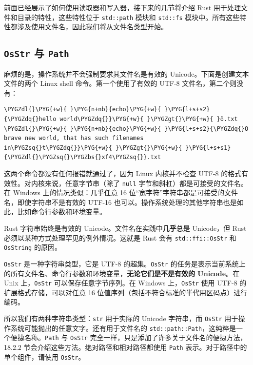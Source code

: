 前面已经展示了如何使用读取器和写入器，接下来的几节将介绍 Rust 用于处理文件和目录的特性，这些特性位于 \texttt{std::path} 模块和 \texttt{std::fs} 模块中。所有这些特性都涉及使用文件名，因此我们将从文件名类型开始。

\subsection{\texttt{OsStr} 与 \texttt{Path}}

麻烦的是，操作系统并不会强制要求其文件名是有效的 Unicode。下面是创建文本文件的两个 Linux shell 命令。第一个使用了有效的 UTF-8 文件名，第二个则没有：

\begin{Verbatim}[commandchars=\\\{\},breaklines=true,breakanywhere=true,fontsize=\codefont,xleftmargin=17bp]
\PYGZdl{}\PYG{+w}{ }\PYG{n+nb}{echo}\PYG{+w}{ }\PYG{l+s+s2}{\PYGZdq{}hello world\PYGZdq{}}\PYG{+w}{ }\PYGZgt{}\PYG{+w}{ }ô.txt
\PYGZdl{}\PYG{+w}{ }\PYG{n+nb}{echo}\PYG{+w}{ }\PYG{l+s+s2}{\PYGZdq{}O brave new world, that has such filenames in\PYGZsq{}t\PYGZdq{}}\PYG{+w}{ }\PYGZgt{}\PYG{+w}{ }\PYG{l+s+s1}{\PYGZdl{}\PYGZsq{}\PYGZbs{}xf4\PYGZsq{}}.txt
\end{Verbatim}

这两个命令都没有任何报错就通过了，因为 Linux 内核并不检查 UTF-8 的格式有效性。对内核来说，任意字节串（除了 \texttt{null} 字节和斜杠）都是可接受的文件名。在 Windows 上的情况类似：几乎任意 16 位“宽字符”字符串都是可接受的文件名，即使字符串不是有效的 UTF-16 也可以。操作系统处理的其他字符串也是如此，比如命令行参数和环境变量。

Rust 字符串始终是有效的 Unicode。文件名在实践中\textbf{几乎}总是 Unicode，但 Rust 必须以某种方式处理罕见的例外情况。这就是 Rust 会有 \texttt{std::ffi::OsStr} 和 \texttt{OsString} 的原因。

\texttt{OsStr} 是一种字符串类型，它是 UTF-8 的超集。\texttt{OsStr} 的任务是表示当前系统上的所有文件名、命令行参数和环境变量，\textbf{无论它们是不是有效的 Unicode}。在 Unix 上，\texttt{OsStr} 可以保存任意字节序列。在 Windows 上，\texttt{OsStr} 使用 UTF-8 的扩展格式存储，可以对任意 16 位值序列（包括不符合标准的半代用区码点）进行编码。

所以我们有两种字符串类型：\texttt{str} 用于实际的 Unicode 字符串，而 \texttt{OsStr} 用于操作系统可能抛出的任意文字。还有用于文件名的 \texttt{std::path::Path}，这纯粹是一个便捷名称。\texttt{Path} 与 \texttt{OsStr} 完全一样，只是添加了许多关于文件名的便捷方法，18.2.2 节会介绍这些方法。绝对路径和相对路径都使用 \texttt{Path} 表示。对于路径中的单个组件，请使用 \texttt{OsStr}。

